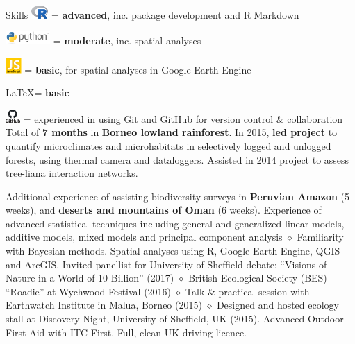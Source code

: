 
\begin{rubric}{Skills}
    \includegraphics[height=0.5cm]{Rlogo.png} = \textbf {advanced}, inc. package development and R Markdown
    \par \includegraphics[height=0.5cm]{python-logo.png} = \textbf{moderate}, inc. spatial analyses
    \par \includegraphics[height=0.6cm]{javascript-logo.jpg} = \textbf{basic}, for spatial analyses in Google Earth Engine
    \par \LaTeX = \textbf{basic}
    \par \includegraphics[height=0.5cm]{github-logo.png} = experienced in using Git and GitHub for version control \& collaboration
\entry*[Fieldwork]
    Total of \textbf{7 months} in \textbf{Borneo lowland rainforest}. In 2015, \textbf{led project} to quantify microclimates and microhabitats in selectively logged and unlogged forests, using thermal camera and dataloggers. Assisted in 2014 project to assess tree-liana interaction networks.
    \par \hfill
    \par Additional experience of assisting biodiversity surveys in \textbf{Peruvian Amazon} (5 weeks), and \textbf{deserts and mountains of Oman} (6 weeks).
	Experience of advanced statistical techniques including general and generalized linear models, additive models, mixed models and principal component analysis $\diamond$ Familiarity with Bayesian methods.
\entry*[GIS]
	Spatial analyses using R, Google Earth Engine, QGIS and ArcGIS.
	Invited panellist for University of Sheffield debate: ``Visions of Nature in a World of 10 Billion'' (2017) $\diamond$ British Ecological Society (BES) ``Roadie'' at Wychwood Festival (2016) $\diamond$ Talk \& practical session with Earthwatch Institute in Malua, Borneo (2015) $\diamond$ Designed and hosted ecology stall at Discovery Night, University of Sheffield, UK (2015).
	Advanced Outdoor First Aid with ITC First.
\entry*[Driving]
	Full, clean UK driving licence.
\end{rubric}
